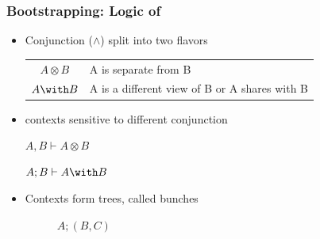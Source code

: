\begin{frame}[c]
  \frametitle{Bootstrapping: Logic of \BI{}}
  \begin{center}
    \begin{itemize}

    \item<1-> Conjunction ($\wedge$) split into two flavors
      \begin{center}
      \begin{tabular}[c]{c l}
      $A \otimes B$& A is separate from B\\
      $A \with B$&  A is a different view of B or A shares with B
      \end{tabular}
    \end{center}
    \item<2-> \BI{} contexts sensitive to different conjunction
      \begin{center}
        \begin{minipage}[h]{0.5\linewidth}
          $A, B \vdash A \otimes B$
        \end{minipage}%
        \begin{minipage}[h]{0.5\linewidth}
          $A; B \vdash A \with B$
        \end{minipage}
    \end{center}
    \item<3-> Contexts form trees, called bunches
      \begin{center}
        \begin{figure}[h]\centering
      \begin{minipage}{0.5\linewidth}\centering
        \caption*{$(A;B),C$}
      \end{minipage}%
      \begin{minipage}{0.5\linewidth}\centering
        \caption*{$A;(B,C)$}
      \end{minipage}
    \end{figure}

    \end{center}

\end{itemize}
\end{center}
\end{frame}

